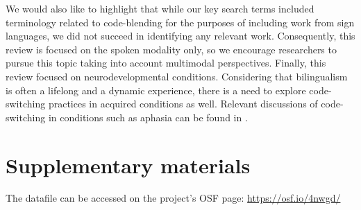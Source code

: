 \documentclass[output=paper]{langscibook}
\begin{document}
We would also like to highlight that while our key search terms included terminology related to code-blending for the purposes of including work from sign languages, we did not succeed in identifying any relevant work. Consequently, this review is focused on the spoken modality only, so we encourage researchers to pursue this topic taking into account multimodal perspectives. Finally, this review focused on neurodevelopmental conditions. Considering that bilingualism is often a lifelong and a dynamic experience, there is a need to explore code-switching practices in acquired conditions as well. Relevant discussions of code-switching in conditions such as aphasia can be found in \citet{Aboh2020}.

\section*{Supplementary materials}

The datafile can be accessed on the project's OSF page: \url{https://osf.io/4nwgd/}


\sloppy\printbibliography[heading=subbibliography,notkeyword=this]
\end{document}
